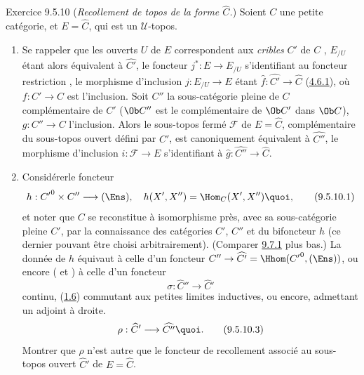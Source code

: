 \begin{enonce*}[remark]{Exercice 9.5.10}
(\emph{Recollement de topos de la forme $\widehat{C}$.}) Soient $C$
une petite catégorie, et $E=\widehat{C}$, qui est un
$𝒰$-topos.
\begin{enumerate}
\renewcommand{\theenumi}{\alph{enumi}}
\renewcommand{\labelenumi}{\theenumi)}
\item Se rappeler que les ouverts $U$ de $E$ correspondent aux
\emph{cribles} $C'$ de $C$ , $E_{/U}$
étant alors équivalent à $\widehat{C'}$, le foncteur
$j^{\ast}:E\rightarrow E_{/U}$ s'identifiant au foncteur restriction
, \ie le morphisme d'inclusion $j:E_{/U}\rightarrow E$ étant
$\widehat{f}:\widehat{C'}\rightarrow \widehat{C}$
(\hyperref[IV.subsubsec4.6.1]{4.6.1}), où $f:C'\rightarrow C$ est l'inclusion.
Soit $C''$ la sous-catégorie pleine de $C$ complémentaire de $C'$
(\ie $\Ob C''$ est le complémentaire de $\Ob C'$ dans $\Ob C$),
$g:C''\rightarrow C$ l'inclusion. Alors le sous-topos fermé
$\mathcal{F}$ de $E=\widehat{C}$, complémentaire du sous-topos
ouvert défini par $C'$, est canoniquement équivalent à
$\widehat{C''}$, le morphisme d'inclusion $i:\mathcal{F}\rightarrow
E$ s'identifiant à $\widehat{g}:\widehat{C''}\rightarrow
\widehat{C}$.

\item Considérer\pageoriginale le foncteur
\begin{equation*}
h:{C'}^0\times C''\longrightarrow (\Ens),\quad
h(X',X'')=\Hom_C(X',X''){\quoi},\tag{9.5.10.1}
\end{equation*}
et noter que $C$ se reconstitue à isomorphisme près, avec sa
sous-catégorie pleine $C'$, par la connaissance des catégories $C'$,
$C''$ et du bifoncteur $h$ (ce dernier pouvant être choisi
arbitrairement). (Comparer \hyperref[IV.subsec9.7.1]{9.7.1} plus bas.) La donnée
de $h$ équivaut à celle d'un foncteur $C''\rightarrow
\widehat{C'}=\Hhom({C'}^0,(\Ens))$, ou encore ( et
) à celle d'un foncteur
\begin{equation*}
\sigma:\widehat{C}''\longrightarrow \widehat{C}'\tag{9.5.10.2}
\end{equation*}
continu, \ie (\hyperref[IV.cor1.6]{1.6}) commutant aux petites limites
inductives, ou encore, admettant un adjoint à droite.
\begin{equation*}
\rho:\widehat{C}'\longrightarrow \widehat{C''}{\quoi}.\tag{9.5.10.3}
\end{equation*}
Montrer que $\rho$ n'est autre que le foncteur de recollement
associé au sous-topos ouvert $\widehat{C}'$ de $E=\widehat{C}$.


\end{enumerate}
\end{enonce*}

